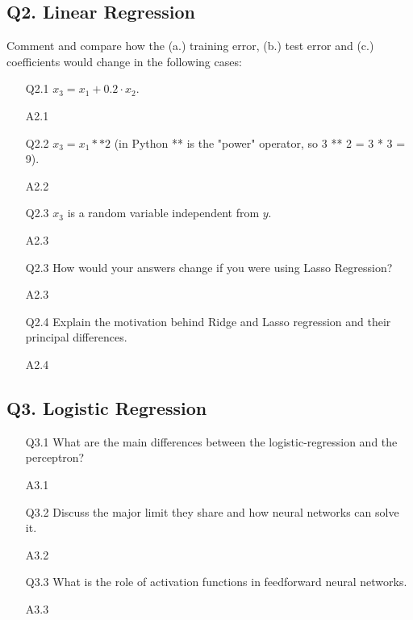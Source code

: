 \documentclass[unicode, 11pt, a4paper]{scrartcl}
\begin{document}
\subsection*{Q2. Linear Regression}
Comment and compare how the (a.) training error, (b.) test error and (c.) coefficients would change in the following cases:
\begin{itemize}
	\item[Q2.1] $x_3 = x_1 + 0.2 \cdot x_2$.
	\item[A2.1] ~\\

	\item[Q2.2] $x_3 = x_1 ** 2$ (in Python ** is the "power" operator, so  3 ** 2 = 3 * 3 = 9).
	\item[A2.2] ~\\

	\item[Q2.3] $x_3$ is a random variable independent from $y$.
	\item[A2.3] ~\\

	\item[Q2.3] How would your answers change if you were using Lasso Regression?
	\item[A2.3] ~\\

	\item[Q2.4] Explain the motivation behind Ridge and Lasso regression and their principal differences.
	\item[A2.4] ~\\
\end{itemize}

\subsection*{Q3. Logistic Regression}
\begin{itemize}
	\item[Q3.1] What are the main differences between the logistic-regression and the perceptron?
	\item[A3.1] ~\\

	\item[Q3.2] Discuss the major limit they share and how neural networks can solve it.
	\item[A3.2] ~\\

	\item[Q3.3] What is the role of activation functions in feedforward neural networks.
	\item[A3.3] ~\\
\end{itemize}
\end{document}
